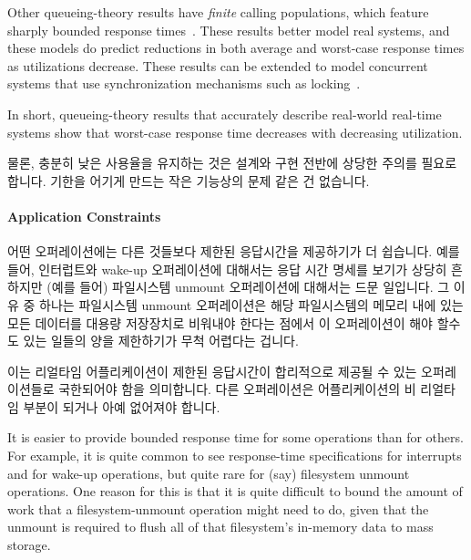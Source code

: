 {	Other queueing-theory results have \emph{finite}
	calling populations, which feature sharply bounded response
	times~\cite{Hillier86}.
	These results better model real systems, and these models do
	predict reductions in both average and worst-case response
	times as utilizations decrease.
	These results can be extended to model concurrent systems that use
	synchronization mechanisms such as
	locking~\cite{BjoernBrandenburgPhD,DipankarSarma2004OLSscalability}.

	In short, queueing-theory results that accurately describe
	real-world real-time systems show that worst-case response
	time decreases with decreasing utilization.

	\fi

}\QuickQuizEnd

물론, 충분히 낮은 사용율을 유지하는 것은 설계와 구현 전반에 상당한 주의를
필요로 합니다.
기한을 어기게 만드는 작은 기능상의 문제 같은 건 없습니다.

\paragraph{Application Constraints}
\label{sec:advsync:Application Constraints}

어떤 오퍼레이션에는 다른 것들보다 제한된 응답시간을 제공하기가 더 쉽습니다.
예를 들어, 인터럽트와 wake-up 오퍼레이션에 대해서는 응답 시간 명세를 보기가
상당히 흔하지만 (예를 들어) 파일시스템 unmount 오퍼레이션에 대해서는 드문
일입니다.
그 이유 중 하나는 파일시스템 unmount 오퍼레이션은 해당 파일시스템의 메모리 내에
있는 모든 데이터를 대용량 저장장치로 비워내야 한다는 점에서 이 오퍼레이션이
해야 할수도 있는 일들의 양을 제한하기가 무척 어렵다는 겁니다.

이는 리얼타임 어플리케이션이 제한된 응답시간이 합리적으로 제공될 수 있는
오퍼레이션들로 국한되어야 함을 의미합니다.
다른 오퍼레이션은 어플리케이션의 비 리얼타임 부분이 되거나 아예 없어져야
합니다.

\iffalse

It is easier to provide bounded response time for some operations than
for others.
For example, it is quite common to see response-time specifications for
interrupts and for wake-up operations, but quite rare for (say)
filesystem unmount operations.
One reason for this is that it is quite difficult to bound the amount
of work that a filesystem-unmount operation might need to do, given that
the unmount is required to flush all of that filesystem's in-memory
data to mass storage.

